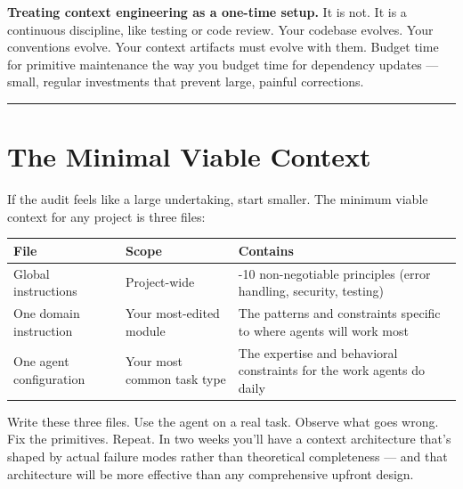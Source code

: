 \documentclass[
  a4paper,
  DIV=11,
  numbers=noendperiod]{scrreprt}
\newcounter{none} %
\begin{document}
\textbf{Treating context engineering as a one-time setup.} It is not. It
is a continuous discipline, like testing or code review. Your codebase
evolves. Your conventions evolve. Your context artifacts must evolve
with them. Budget time for primitive maintenance the way you budget time
for dependency updates --- small, regular investments that prevent
large, painful corrections.

\begin{center}\rule{0.5\linewidth}{0.5pt}\end{center}

\section{The Minimal Viable Context}\label{the-minimal-viable-context}

If the audit feels like a large undertaking, start smaller. The minimum
viable context for any project is three files:

{\def\LTcaptype{none} %
\begin{longtable}[]{@{}
  >{\raggedright\arraybackslash}p{}
  >{\raggedright\arraybackslash}p{}
  >{\raggedright\arraybackslash}p{}@{}}
\toprule\noalign{}
\begin{minipage}[b]{\linewidth}\raggedright
File
\end{minipage} & \begin{minipage}[b]{\linewidth}\raggedright
Scope
\end{minipage} & \begin{minipage}[b]{\linewidth}\raggedright
Contains
\end{minipage} \\
\midrule\noalign{}
\endhead
\bottomrule\noalign{}
\endlastfoot
Global instructions & Project-wide & 5-10 non-negotiable principles
(error handling, security, testing) \\
One domain instruction & Your most-edited module & The patterns and
constraints specific to where agents will work most \\
One agent configuration & Your most common task type & The expertise and
behavioral constraints for the work agents do daily \\
\end{longtable}
}

Write these three files. Use the agent on a real task. Observe what goes
wrong. Fix the primitives. Repeat. In two weeks you'll have a context
architecture that's shaped by actual failure modes rather than
theoretical completeness --- and that architecture will be more
effective than any comprehensive upfront design.
\end{document}
